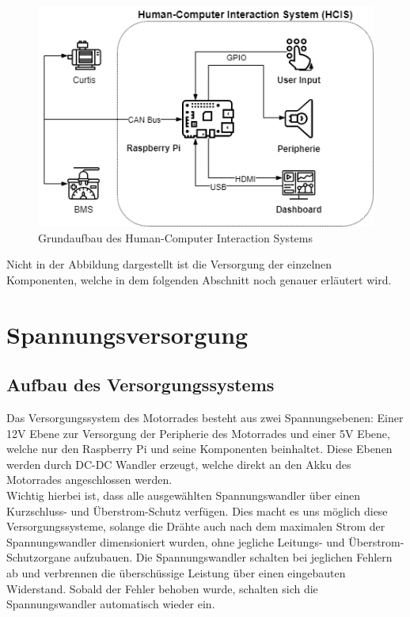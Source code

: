 \begin{figure}[H]
	\begin{center}
		\includegraphics[scale=0.5]{figures/hcis/HCIS_Grundfunktion.png}
		\caption{Grundaufbau des Human-Computer Interaction Systems}
		\label{fig:aufbauHCIS}
	\end{center}
\end{figure}

Nicht in der Abbildung dargestellt ist die Versorgung der einzelnen Komponenten, welche in dem folgenden Abschnitt noch genauer erläutert wird.

\newpage



\section{Spannungsversorgung}

\subsection{Aufbau des Versorgungssystems} \label{sec:aufbauversorgung}
Das Versorgungssystem des Motorrades besteht aus zwei Spannungsebenen: Einer 12V Ebene zur Versorgung der Peripherie des Motorrades und einer 5V Ebene, welche nur den Raspberry Pi und seine Komponenten beinhaltet. Diese Ebenen werden durch DC-DC Wandler erzeugt, welche direkt an den Akku des Motorrades angeschlossen werden. \\
Wichtig hierbei ist, dass alle ausgewählten Spannungswandler über einen Kurzschluss- und Überstrom-Schutz verfügen. Dies macht es uns möglich diese Versorgungssysteme, solange die Drähte auch nach dem maximalen Strom der Spannungswandler dimensioniert wurden, ohne jegliche Leitungs- und Überstrom-Schutzorgane aufzubauen. Die Spannungswandler schalten bei jeglichen Fehlern ab und verbrennen die überschüssige Leistung über einen eingebauten Widerstand. Sobald der Fehler behoben wurde, schalten sich die Spannungswandler automatisch wieder ein.
